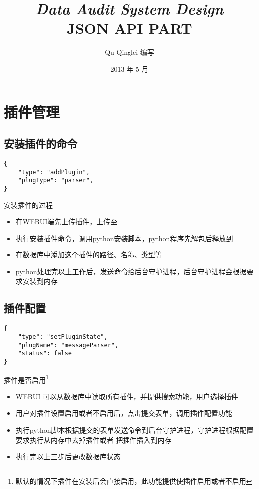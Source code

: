 \documentclass{article}
\begin{document}
\title{%
  {\huge \textit{Data Audit System Design}\\\smallskip}%
  {\LARGE \textsf{JSON API PART}}
}

\author{Qu Qinglei 编写 \\[3mm]
       }

\date{2013 年 5 月}

\maketitle

\begin{multicols}{2}
\tableofcontents
\end{multicols}

\section{插件管理}
\subsection{安装插件的命令}
\begin{verbatim}
{
    "type": "addPlugin",
    "plugType": "parser",
}
\end{verbatim}
\textsf{安装插件的过程}
\begin{itemize}
\item[(1)] 在WEBUI端先上传插件，上传至
\item[(2)] 执行安装插件命令，调用python安装脚本，python程序先解包后释放到
\item[(3)] 在数据库中添加这个插件的路径、名称、类型等
\item[(4)] python处理完以上工作后，发送命令给后台守护进程，后台守护进程会根据要求安装到内存
\end{itemize}

\subsection{插件配置}
\begin{verbatim}
{
    "type": "setPluginState",
    "plugName": "messageParser",
    "status": false
}
\end{verbatim}
\textsf{插件是否启用}\footnote{默认的情况下插件在安装后会直接启用，此功能提供使插件启用或者不启用}
\begin{itemize}
\item[(1)] WEBUI 可以从数据库中读取所有插件，并提供搜索功能，用户选择插件
\item[(2)] 用户对插件设置启用或者不启用后，点击提交表单，调用插件配置功能
\item[(3)] 执行python脚本根据提交的表单发送命令到后台守护进程，守护进程根据配置要求执行从内存中去掉插件或者
把插件插入到内存
\item[(4)] 执行完以上三步后更改数据库状态
\end{itemize}
\end{document}
